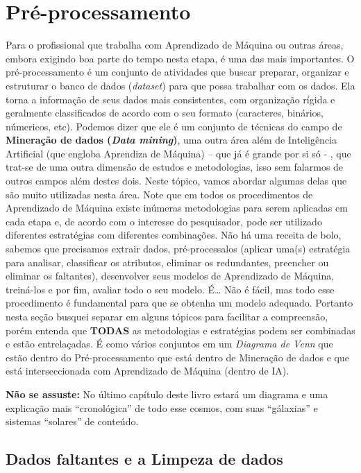 \documentclass[
]{book}
\begin{document}
\hypertarget{preprocesso}{%
\chapter{Pré-processamento}\label{preprocesso}}

Para o profissional que trabalha com Aprendizado de Máquina ou outras áreas, embora exigindo boa parte do tempo nesta etapa, é uma das mais importantes. O pré-processamento é um conjunto de atividades que buscar preparar, organizar e estruturar o banco de dados (\emph{dataset}) para que possa trabalhar com os dados. Ela torna a informação de seus dados mais consistentes, com organização rígida e geralmente classificados de acordo com o seu formato (caracteres, binários, númericos, etc). Podemos dizer que ele é um conjunto de técnicas do campo de \textbf{Mineração de dados (\emph{Data mining})}, uma outra área além de Inteligência Artificial (que engloba Aprendiza de Máquina) -- que já é grande por si só - , que trat-se de uma outra dimensão de estudos e metodologias, isso sem falarmos de outros campos além destes dois. Neste tópico, vamos abordar algumas delas que são muito utilizadas nesta área. Note que em todos os procedimentos de Aprendizado de Máquina existe inúmeras metodologias para serem aplicadas em cada etapa e, de acordo com o interesse do pesquisador, pode ser utilizado diferentes estratégias com diferentes combinações. Não há uma receita de bolo, sabemos que precisamos extrair dados, pré-processalos (aplicar uma(s) estratégia para analisar, classificar os atributos, eliminar os redundantes, preencher ou eliminar os faltantes), desenvolver seus modelos de Aprendizado de Máquina, treiná-los e por fim, avaliar todo o seu modelo. É\ldots{} Não é fácil, mas todo esse procedimento é fundamental para que se obtenha um modelo adequado. Portanto nesta seção busquei separar em alguns tópicos para facilitar a compreensão, porém entenda que \textbf{TODAS} as metodologias e estratégias podem ser combinadas e estão entrelaçadas. É como vários conjuntos em um \emph{Diagrama de Venn} que estão dentro do Pré-processamento que está dentro de Mineração de dados e que está interseccionada com Aprendizado de Máquina (dentro de IA).

\textbf{Não se assuste:} No último capítulo deste livro estará um diagrama e uma explicação mais ``cronológica'' de todo esse cosmos, com suas ``gálaxias'' e sistemas ``solares'' de conteúdo.

\hypertarget{dados-faltantes-e-a-limpeza-de-dados}{%
\section{Dados faltantes e a Limpeza de dados}\label{dados-faltantes-e-a-limpeza-de-dados}}
\end{document}
